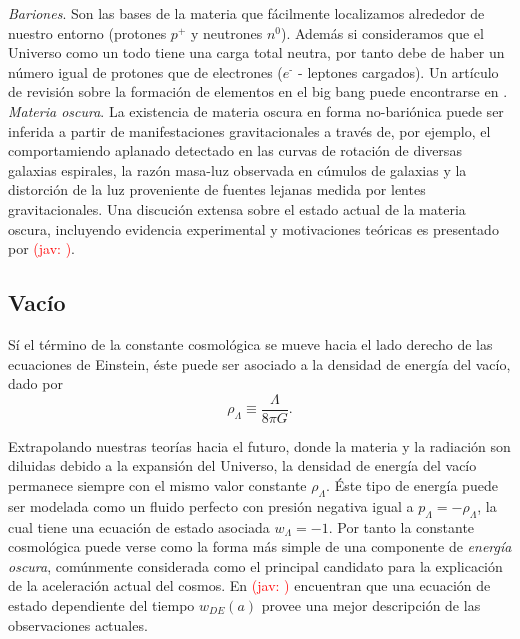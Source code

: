 \documentclass[10.5pt,prb,
               showpacs,            %
               preprintnumbers,     %
               aps,                 %
               prl,          	    %
               letterpaper,             %
               superscriptaddress,      %
               nofootinbib,         %
               tightenlines,        %
               floats,floatfix      %
               ,usenatbib]{revtex4-1}%
\def\beq{\begin{equation}}
\def\eeq{\end{equation}}
\newcommand{\jav}[1]{\textcolor{red}{(jav: #1)}}
\begin{document}
\textit{Bariones}. Son las bases de la materia que f\'acilmente localizamos alrededor de nuestro entorno 
(protones $p^\texttt{+}$ y neutrones $n^0$).
Adem\'as si consideramos que el Universo como un todo tiene una carga total neutra, por tanto debe de haber 
un n\'umero igual de protones que de electrones ($e^\texttt{-}$ - leptones cargados). 
Un art\'iculo de revisi\'on sobre la formaci\'on de elementos en el big bang puede encontrarse en \cite{BBN}.
\\



\textit{Materia oscura}. La existencia de materia oscura en forma no-bari\'onica puede ser inferida a 
partir de manifestaciones gravitacionales a trav\'es de, por ejemplo, el comportamiendo 
aplanado detectado en las curvas de rotaci\'on de diversas galaxias espirales, la
raz\'on masa-luz observada en c\'umulos de galaxias y la distorci\'on de la luz proveniente 
de fuentes lejanas medida por lentes gravitacionales.
 Una discuci\'on extensa sobre el estado actual de la materia oscura, incluyendo evidencia experimental
y motivaciones te\'oricas es presentado por \jav{\cite{}}.


\subsection*{Vac\'io} 


S\'i el t\'ermino de la constante cosmol\'ogica se mueve hacia el lado derecho de las ecuaciones de Einstein, 
\'este puede ser asociado a la densidad de energ\'ia del vac\'io, dado por 
%
	\beq
		\rho_\Lambda \equiv \frac{\Lambda}{8\pi G}.
	\eeq

\noindent
Extrapolando nuestras teor\'ias hacia el futuro, donde la materia y la radiaci\'on son diluidas debido a la expansi\'on del Universo, 
la densidad de energ\'ia del vac\'io permanece siempre con el mismo valor constante $\rho_\Lambda$.
\'Este tipo de energ\'ia  puede ser modelada como un fluido perfecto con presi\'on negativa igual a $p_\Lambda =-\rho_\Lambda$,
la cual tiene una ecuaci\'on de estado asociada $w_\Lambda=-1$. 
Por tanto la constante cosmol\'ogica puede verse como la forma m\'as simple de una componente de \textit{energ\'ia oscura}, 
com\'unmente considerada como el principal candidato para la explicaci\'on de la aceleraci\'on actual del cosmos.
En \jav{\cite{}} encuentran que una ecuaci\'on de estado dependiente del tiempo $w_{DE}(a)$ provee una mejor descripci\'on de las
observaciones actuales. 
\end{document}

